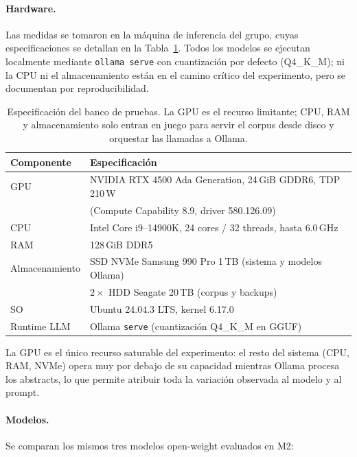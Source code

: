 \paragraph{Hardware.} Las medidas se tomaron en la máquina de inferencia
del grupo, cuyas especificaciones se detallan en la
Tabla~\ref{tab:estudio-economico-hw}. Todos los modelos se ejecutan
localmente mediante \texttt{ollama serve} con cuantización por defecto
(Q4\_K\_M); ni la CPU ni el almacenamiento están en el camino crítico
del experimento, pero se documentan por reproducibilidad.

\begin{table}[h]
\centering\small
\caption{Especificación del banco de pruebas. La GPU es el recurso
limitante; CPU, RAM y almacenamiento solo entran en juego para servir
el corpus desde disco y orquestar las llamadas a Ollama.}
\label{tab:estudio-economico-hw}
\begin{tabular}{ll}
\toprule
Componente & Especificación \\
\midrule
GPU            & NVIDIA RTX 4500 Ada Generation, 24\,GiB GDDR6, TDP 210\,W \\
               & (Compute Capability 8.9, driver 580.126.09) \\
CPU            & Intel Core i9--14900K, 24 cores / 32 threads, hasta 6.0\,GHz \\
RAM            & 128\,GiB DDR5 \\
Almacenamiento & SSD NVMe Samsung 990 Pro 1\,TB (sistema y modelos Ollama) \\
               & $2\times$ HDD Seagate 20\,TB (corpus y backups) \\
SO             & Ubuntu 24.04.3 LTS, kernel 6.17.0 \\
Runtime LLM    & Ollama \texttt{serve} (cuantización Q4\_K\_M en GGUF) \\
\bottomrule
\end{tabular}
\end{table}

La GPU es el único recurso saturable del experimento: el resto del
sistema (CPU, RAM, NVMe) opera muy por debajo de su capacidad mientras
Ollama procesa los abstracts, lo que permite atribuir toda la variación
observada al modelo y al prompt.

\paragraph{Modelos.} Se comparan los mismos tres modelos open-weight
evaluados en M2:

